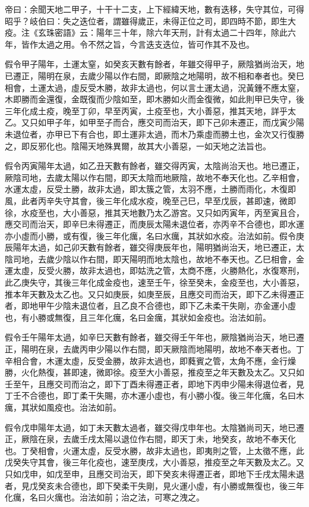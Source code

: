 帝曰：余聞天地二甲子，十干十二支，上下經緯天地，數有迭移，失守其位，可得昭乎？岐伯曰：失之迭位者，謂雖得歲正，未得正位之司，即四時不節，即生大疫。注《玄珠密語》云：陽年三十年，除六年天刑，計有太過二十四年，除此六年，皆作太過之用。令不然之旨，今言迭支迭位，皆可作其不及也。

假令甲子陽年，土運太窒，如癸亥天數有餘者，年雖交得甲子，厥陰猶尚治天，地已遷正，陽明在泉，去歲少陽以作右間，即厥陰之地陽明，故不相和奉者也。癸巳相會，土運太過，虛反受木勝，故非太過也，何以言土運太過，況黃鍾不應太窒，木即勝而金還復，金既復而少陰如至，即木勝如火而金復微，如此則甲已失守，後三年化成土疫，晚至丁卯，早至丙寅，土疫至也，大小善惡，推其天地，詳乎太乙。又只如甲子年，如甲至子而合，應交司而治天，即下己卯未遷正，而戊寅少陽未退位者，亦甲已下有合也，即土運非太過，而木乃乘虛而勝土也，金次又行復勝之，即反邪化也。陰陽天地殊異爾，故其大小善惡，一如天地之法旨也。

假令丙寅陽年太過，如乙丑天數有餘者，雖交得丙寅，太陰尚治天也。地已遷正，厥陰司地，去歲太陽以作右間，即天太陰而地厥陰，故地不奉天化也。乙辛相會，水運太虛，反受土勝，故非太過，即太簇之管，太羽不應，土勝而雨化，木復即風，此者丙辛失守其會，後三年化成水疫，晚至己巳，早至戊辰，甚即速，微即徐，水疫至也，大小善惡，推其天地數乃太乙游宮。又只如丙寅年，丙至寅且合，應交司而治天，即辛巳未得遷正，而庚辰太陽未退位者，亦丙辛不合德也，即水運亦小虛而小勝，或有復，後三年化癘，名曰水癘，其狀如水疫。治法如前。假令庚辰陽年太過，如己卯天數有餘者，雖交得庚辰年也，陽明猶尚治天，地已遷正，太陰司地，去歲少陰以作右間，即天陽明而地太陰也，故地不奉天也。乙巳相會，金運太虛，反受火勝，故非太過也，即姑洗之管，太商不應，火勝熱化，水復寒刑，此乙庚失守，其後三年化成金疫也，速至壬午，徐至癸未，金疫至也，大小善惡，推本年天數及太乙也。又只如庚辰，如庚至辰，且應交司而治天，即下乙未得遷正者，即地甲午少陰未退位者，且乙良不合德也，即下乙未柔干失剛，亦金運小虛也，有小勝或無復，且三年化癘，名曰金癘，其狀如金疫也。治法如前。

假令壬午陽年太過，如辛巳天數有餘者，雖交得壬午年也，厥陰猶尚治天，地已遷正，陽明在泉，去歲丙申少陽以作右間，即天厥陰而地陽明，故地不奉天者也。丁辛相合會，木運太虛，反受金勝，故非太過也，即蕤賓之管，太角不應，金行燥勝，火化熱復，甚即速，微即徐。疫至大小善惡，推疫至之年天數及太乙。又只如壬至午，且應交司而治之，即下丁酉未得遷正者，即地下丙申少陽未得退位者，見丁壬不合德也，即丁柔干失賜，亦木運小虛也，有小勝小復。後三年化癘，名曰木癘，其狀如風疫也。治法如前。

假令戊申陽年太過，如丁未天數太過者，雖交得戊申年也。太陰猶尚司天，地已遷正，厥陰在泉，去歲壬戌太陽以退位作右間，即天丁未，地癸亥，故地不奉天化也。丁癸相會，火運太虛，反受水勝，故非太過也，即夷則之管，上太徵不應，此戊癸失守其會，後三年化疫也，速至庚戌，大小善惡，推疫至之年天數及太乙。又只如戊申，如戊至申，且應交司治天，即下癸亥未得遷正者，即地下壬戌太陽未退者，見戊癸亥未合德也，即下癸柔干失剛，見火運小虛，有小勝或無復也，後三年化癘，名曰火癘也。治法如前；治之法，可寒之洩之。

